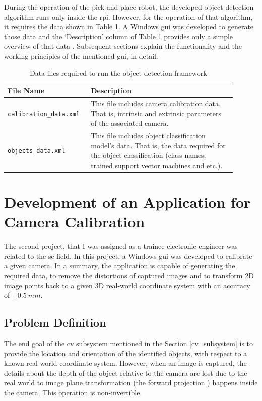 \documentclass[a4paper,12pt]{report}%
\begin{document}
During the operation of the pick and place robot, the developed object detection algorithm runs only inside the \ac{rpi}. However, for the operation of that algorithm, it requires the data shown in Table \ref{table:datafiles}. A Windows \ac{gui} was developed to generate those data and the `Description' column of Table \ref{table:datafiles} provides only a simple overview of that data . Subsequent sections explain the functionality and the working principles of the mentioned \ac{gui}, in detail.\\

\begin{table}[H]
	\captionsetup{font=sc, labelsep=newline}
	\centering
	\caption{ Data files required to run the object detection framework}
	\begin{tabular}{|p{0.3\linewidth}  |p{0.6\linewidth}  |}
		\hline
		\textbf{File Name} & \textbf{Description}\\\hline
		{\tt calibration\_data.xml} & This file includes camera calibration data. That is, intrinsic and extrinsic parameters of the associated camera.\\ \hline
		{\tt objects\_data.xml} & This file includes object classification model's data. That is, the data required for the object classification (class names, trained support vector machines and etc.).\\
		\hline
	\end{tabular}
	\label{table:datafiles}
\end{table}




\pagebreak
\section{Development of an Application for Camera Calibration}

The second project, that I was assigned as a trainee electronic engineer was related to the \ac{se} field. In this project, a Windows \ac{gui} was developed to calibrate a given camera. In a summary, the application is capable of generating the required data, to remove the distortions of captured images and to transform 2D image points back to a given 3D real-world coordinate system with an accuracy of $\pm 0.5 ~mm$.

\subsection{Problem Definition}
The end goal of the \ac{cv} subsystem mentioned in the Section \ref{cv_subsystem} is to provide the location and orientation of the identified objects, with respect to a known real-world coordinate system. However, when an image is captured, the details about the depth of the object relative to the camera are lost due to the real world to image plane transformation (the forward projection \cite{hartley_zisserman_2004}) happens inside the camera. This operation is non-invertible.\\
\end{document}
